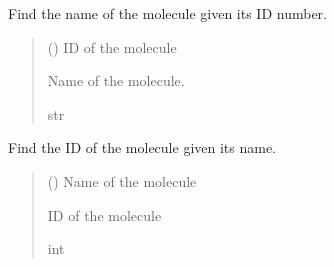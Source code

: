 \documentclass[letterpaper,10pt,english]{sphinxmanual}
\begin{document}

\begin{fulllineitems}
\label{\detokenize{api:nemesispy.get_gas_name}}
\pysigstartsignatures
{}
\pysigstopsignatures
\sphinxAtStartPar
Find the name of the molecule given its ID number.
\begin{quote}\begin{description}
\sphinxAtStartPar
{} () \textendash{} ID of the molecule

\sphinxAtStartPar
{} \textendash{} Name of the molecule.

\sphinxAtStartPar
str

\end{description}\end{quote}

\end{fulllineitems}


\begin{fulllineitems}
\label{\detokenize{api:nemesispy.get_gas_id}}
\pysigstartsignatures
{}
\pysigstopsignatures
\sphinxAtStartPar
Find the ID of the molecule given its name.
\begin{quote}\begin{description}
\sphinxAtStartPar
{} () \textendash{} Name of the molecule

\sphinxAtStartPar
{} \textendash{} ID of the molecule

\sphinxAtStartPar
int

\end{description}\end{quote}

\end{fulllineitems}
\end{document}
